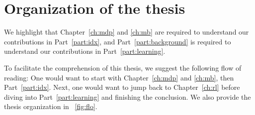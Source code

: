 \section{Organization of the thesis}

We highlight that Chapter~\ref{ch:mdp} and \ref{ch:mb} are required to understand our contributions in Part~\ref{part:idx}, and
Part~\ref{part:background} is required to understand our contributions in Part~\ref{part:learning}.

To facilitate the comprehension of this thesis, we suggest the following flow of reading: One would want to start with Chapter~\ref{ch:mdp} and \ref{ch:mb}, then Part~\ref{part:idx}. Next, one would want to jump back to Chapter~\ref{ch:rl} before diving into Part~\ref{part:learning} and finishing the conclusion.
We also provide the thesis organization in \figurename~\ref{fig:flo}.


